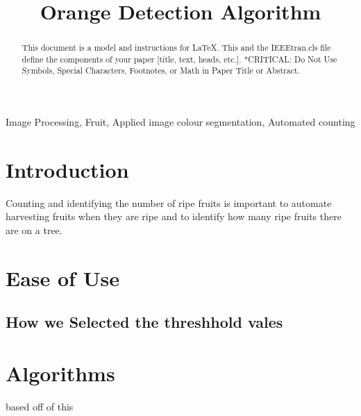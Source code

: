 \documentclass[conference]{IEEEtran}
\begin{document}
\title{Orange Detection Algorithm}

\author{
\and
{}
}

\maketitle

\begin{abstract}
This document is a model and instructions for \LaTeX.
This and the IEEEtran.cls file define the components of your paper [title, text, heads, etc.]. *CRITICAL: Do Not Use Symbols, Special Characters, Footnotes, 
or Math in Paper Title or Abstract.
\end{abstract}

\begin{IEEEkeywords}
Image Processing, Fruit, Applied image colour segmentation, Automated counting
\end{IEEEkeywords}

\section{Introduction}

Counting and identifying the number of ripe fruits is important to automate harvesting fruits when they are ripe and to identify how many ripe fruits there are on a tree.

\section{Ease of Use}

\subsection{How we Selected the threshhold vales}


\section{Algorithms}

based off of this \cite{payne_estimation_2013}
\end{document}
